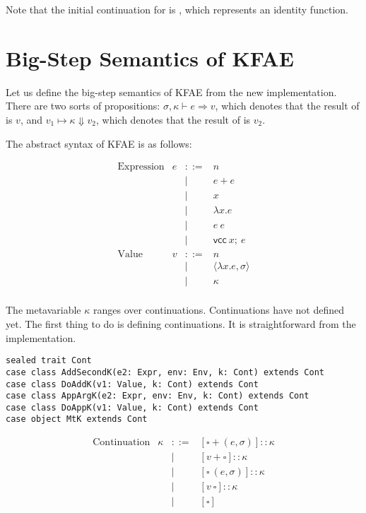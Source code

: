 Note that the initial continuation for  is , which
represents an identity function.

\section{Big-Step Semantics of KFAE}

Let us define the big-step semantics of KFAE from the new implementation. There
are two sorts of propositions: $\sigma,\kappa\vdash e\Rightarrow v$, which
denotes that the result of  is $v$, and
$v_1\mapsto\kappa\Downarrow v_2$, which denotes that the result of
 is $v_2$.


The abstract syntax of KFAE is as follows:

\[
\begin{array}{lrcl}
\text{Expression} & e & ::= & n \\
&&|& e+e \\
&&|& x \\
&&|& \lambda x.e \\
&&|& e\ e \\
&&|& \textsf{vcc}\ x;\ e \\
\text{Value} & v & ::= & n \\
&&|& \langle\lambda x.e,\sigma\rangle \\
&&|& \kappa \\
\end{array}
\]

The metavariable $\kappa$ ranges over continuations. Continuations have not
defined yet. The first thing to do is defining continuations. It is
straightforward from the implementation.

\begin{verbatim}
sealed trait Cont
case class AddSecondK(e2: Expr, env: Env, k: Cont) extends Cont
case class DoAddK(v1: Value, k: Cont) extends Cont
case class AppArgK(e2: Expr, env: Env, k: Cont) extends Cont
case class DoAppK(v1: Value, k: Cont) extends Cont
case object MtK extends Cont
\end{verbatim}

\[
\begin{array}{lrcl}
\text{Continuation} & \kappa & ::= & [\square+(e,\sigma)]::\kappa \\
&&|& [v+\square]::\kappa \\
&&|& [\square\ (e,\sigma)]::\kappa \\
&&|& [v\ \square]::\kappa \\
&&|& [\square] \\
\end{array}
\]


